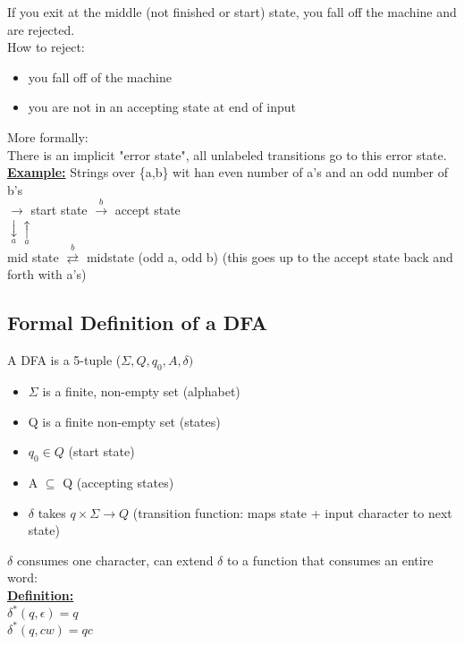 \documentclass[12pt]{article}
\newcommand{\myt}[1]{\textbf{\underline{#1}}}
\begin{document}
	If you exit at the middle (not finished or start) state, you fall off the machine and are rejected.\\
	How to reject:
	\begin{itemize}
		\item you fall off of the machine
		\item you are not in an accepting state at end of input
	\end{itemize}
	
	More formally:\\
	There is an implicit "error state", all unlabeled transitions go to this error state.\\
	
	\myt{Example:} Strings over \{a,b\} wit han even number of a's and an odd number of b's\\
	
	$\rightarrow$ start state $\overset{b}{\rightarrow}$ accept state\\
	$\underset{a}{\downarrow} \underset{a}{\uparrow}$\\
	mid state $\overset{b}{\rightleftarrows}$ midstate (odd a, odd b) (this goes up to the accept state back and forth with a's)\\
	
	\subsection*{Formal Definition of a DFA}
	A DFA is a 5-tuple ($\Sigma, Q, q_0, A, \delta)$\\
	\begin{itemize}
		\item $\Sigma$ is a finite, non-empty set (alphabet)
		\item Q is a finite non-empty set (states)
		\item $q_0 \in Q$ (start state)
		\item A $\subseteq$ Q (accepting states)
		\item $\delta$ takes $q \times \Sigma \rightarrow Q$ (transition function: maps state + input character to next state)
	\end{itemize}
	
	$\delta$ consumes one character, can extend $\delta$ to a function that consumes an entire word:\\
	
	\myt{Definition: }\\
	$\delta^* (q,\epsilon) = q$\\
	$\delta^*(q, cw) = qc$\\
	
\end{document}
